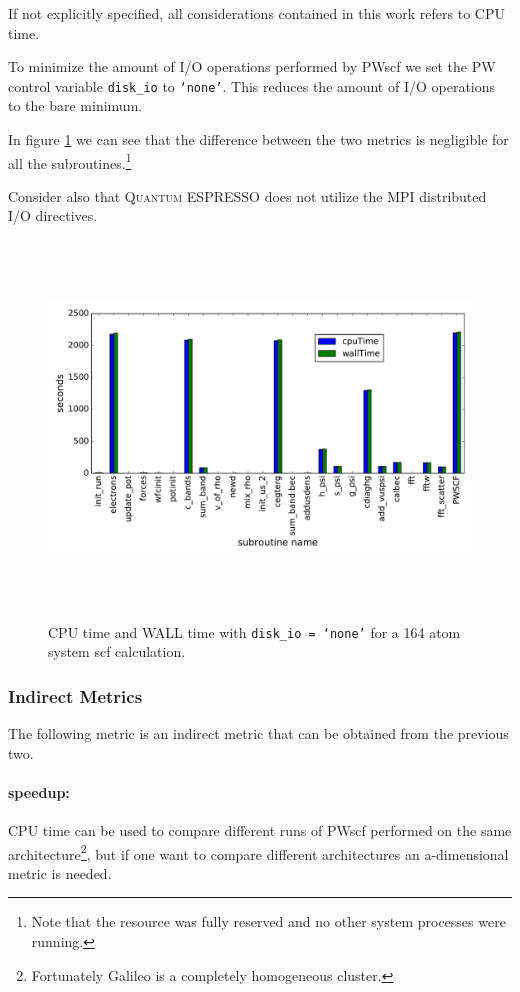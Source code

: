 \documentclass[a4paper,12pt]{article}
\newcommand\QE{\textsc{Quantum} ESPRESSO }
\begin{document}
If not explicitly specified, all considerations contained in this work refers to CPU time.

To minimize the amount of I/O operations performed by PWscf we set the PW control variable \texttt{disk\_io} to \texttt{`none'}\cite{PWinput}.
This reduces the amount of I/O operations to the bare minimum.

In figure \ref{fig:cpuwalltime} we can see that the difference between the two metrics is negligible for all the subroutines.\footnote{Note that the resource was fully reserved and no other system processes were running.}

Consider also that \QE does not utilize the MPI distributed I/O directives.

\begin{figure}[hhh!]
\begin{center}
	\includegraphics[width=\linewidth ,height=10cm]{cpuwalltime.pdf}	
	\caption{CPU time and WALL time with \texttt{disk\_io = `none'} for a 164 atom system scf calculation.}
	\label{fig:cpuwalltime}
\end{center}
\end{figure}

\subsubsection{Indirect Metrics}

The following metric is an indirect metric that can be obtained from the previous two.

\paragraph{speedup:}  CPU time can be used to compare different runs of PWscf performed on the same architecture\footnote{Fortunately Galileo is a completely homogeneous cluster.}, but if one want to compare different architectures an a-dimensional metric is needed.
\end{document}
